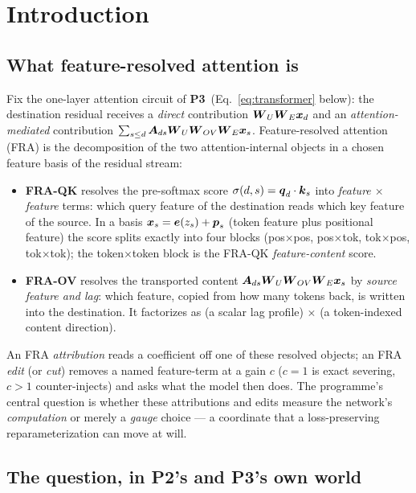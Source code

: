 \documentclass{article}
\newcommand{\qb}{\boldsymbol{q}}
\newcommand{\Ptwo}{\textbf{P2}}
\newcommand{\Pthree}{\textbf{P3}}
\begin{document}
\section{Introduction}\label{sec:intro}

\subsection{What feature-resolved attention is}

Fix the one-layer attention circuit of \Pthree\ (Eq.~\eqref{eq:transformer}
below): the destination residual receives a \emph{direct} contribution
$\boldsymbol{W}_U\boldsymbol{W}_E\boldsymbol{x}_d$ and an \emph{attention-mediated} contribution
$\sum_{s\le d}\boldsymbol{A}_{ds}\boldsymbol{W}_U\boldsymbol{W}_{OV}\boldsymbol{W}_E\boldsymbol{x}_s$. Feature-resolved attention (FRA) is the
decomposition of the two attention-internal objects in a chosen feature basis of
the residual stream:
\begin{itemize}
\item \textbf{FRA-QK} resolves the pre-softmax score $\sigma(d,s)=\qb_d\cdot\kb_s$
into \emph{feature $\times$ feature} terms: which query feature of the destination
reads which key feature of the source. In a basis $\boldsymbol{x}_s=\boldsymbol{e}(z_s)+\boldsymbol{p}_s$ (token
feature plus positional feature) the score splits exactly into four blocks
(pos$\times$pos, pos$\times$tok, tok$\times$pos, tok$\times$tok); the
token$\times$token block is the FRA-QK \emph{feature-content} score.
\item \textbf{FRA-OV} resolves the transported content $\boldsymbol{A}_{ds}\boldsymbol{W}_U\boldsymbol{W}_{OV}\boldsymbol{W}_E\boldsymbol{x}_s$ by
\emph{source feature and lag}: which feature, copied from how many tokens back, is
written into the destination. It factorizes as (a scalar lag profile) $\times$ (a
token-indexed content direction).
\end{itemize}
An FRA \emph{attribution} reads a coefficient off one of these resolved objects; an
FRA \emph{edit} (or \emph{cut}) removes a named feature-term at a gain $c$ ($c=1$ is
exact severing, $c>1$ counter-injects) and asks what the model then does. The
programme's central question is whether these attributions and edits measure the
network's \emph{computation} or merely a \emph{gauge} choice --- a coordinate that a
loss-preserving reparameterization can move at will.

\subsection{The question, in \Ptwo's and \Pthree's own world}
\end{document}
